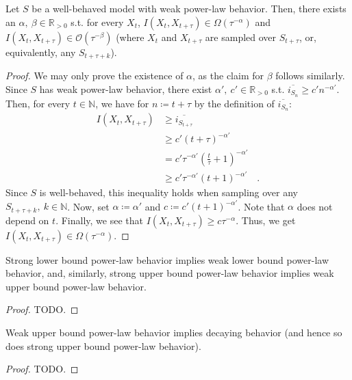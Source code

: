 \documentclass[../../main.tex]{subfiles}
\begin{document}
    \begin{proposition}
        Let $S$ be a well-behaved model with weak power-law behavior. Then, there exists an $\alpha, \ \beta \in \mathbb{R}_{>0}$ s.t. for every $X_t$, $I(X_{t}, X_{t + \tau}) \in \Omega(\tau^{-\alpha})$ and $I(X_{t}, X_{t + \tau}) \in \mathcal{O}(\tau^{-\beta})$ (where $X_t$ and $X_{t + \tau}$ are sampled over $S_{t + \tau}$, or, equivalently, any $S_{t + \tau + k}$).
    \end{proposition}
    \begin{proof}
        We may only prove the existence of $\alpha$, as the claim for $\beta$ follows similarly. Since $S$ has weak power-law behavior, there exist $\alpha', \ c' \in \mathbb{R}_{>0}$ s.t. $\overline{i_{S_n}} \geq c' n^{-\alpha'}$. Then, for every $t \in \mathbb{N}$, we have for $n \coloneqq t + \tau$ by the definition of $\overline{i_{S_n}}$:
        \begin{align*}
            I(X_{t}, X_{t + \tau}) &\geq \overline{i_{S_{t + \tau}}} \\
            &\geq c' (t + \tau)^{-\alpha'} \\
            &= c' \tau^{-\alpha'} (\frac{t}{\tau} + 1)^{-\alpha'} \\
            &\geq c' \tau^{-\alpha'} (t + 1)^{-\alpha'} \quad .
        \end{align*}
        Since $S$ is well-behaved, this inequality holds when sampling over any $S_{t + \tau + k}, \ k \in \mathbb{N}$. Now, set $\alpha \coloneqq \alpha'$ and $c \coloneqq c' (t + 1)^{-\alpha'}$. Note that $\alpha$ does not depend on $t$. Finally, we see that $I(X_{t}, X_{t + \tau}) \geq c \tau^{-\alpha}$. Thus, we get $I(X_{t}, X_{t + \tau}) \in \Omega(\tau^{-\alpha})$.
    \end{proof}

    \begin{theorem}
        Strong lower bound power-law behavior implies weak lower bound power-law behavior, and, similarly, strong upper bound power-law behavior implies weak upper bound power-law behavior.
    \end{theorem}
    \begin{proof}
        TODO.
    \end{proof}

    \begin{proposition}
        Weak upper bound power-law behavior implies decaying behavior (and hence so does strong upper bound power-law behavior).
    \end{proposition}
    \begin{proof}
        TODO.
    \end{proof}
\end{document}
